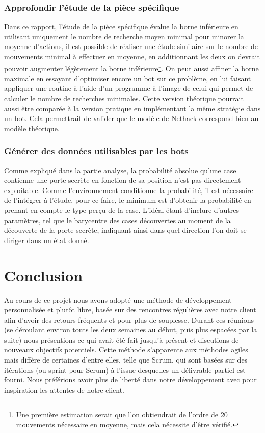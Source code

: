 \documentclass[a4paper,12pt]{article}
\begin{document}
\subsubsection{Approfondir l'étude de la pièce spécifique}
Dans ce rapport, l'étude de la pièce spécifique évalue la borne inférieure en
utilisant uniquement le nombre de recherche moyen minimal pour minorer la
moyenne d'actions, il est possible de réaliser une étude similaire sur le nombre
de mouvements minimal à effectuer en moyenne, en additionnant les deux on
devrait pouvoir augmenter légèrement la borne inférieure\footnote{Une première
estimation serait que l'on obtiendrait de l'ordre de 20 mouvements nécessaire en
moyenne, mais cela nécessite d'être vérifié.}. On peut aussi affiner la borne
maximale en essayant d'optimiser encore un bot sur ce problème, en lui faisant
appliquer une routine à l'aide d'un programme à l'image de celui qui permet de
calculer le nombre de recherches minimales. Cette version théorique pourrait
aussi être comparée à la version pratique en implémentant la même stratégie dans
un bot. Cela permettrait de valider que le modèle de Nethack correspond bien au
modèle théorique.

\subsubsection{Générer des données utilisables par les bots}
Comme expliqué dans la partie analyse, la probabilité absolue qu'une case
contienne une porte secrète en fonction de sa position n'est pas directement
exploitable. Comme l'environnement conditionne la probabilité, il est nécessaire
de l'intégrer à l'étude, pour ce faire, le minimum est d'obtenir la probabilité
en prenant en compte le type perçu de la case. L'idéal étant d'inclure d'autres
paramètres, tel que le barycentre des cases découvertes au moment de la
découverte de la porte secrète, indiquant ainsi dans quel direction l'on doit
se diriger dans un état donné.

\section{Conclusion}

Au cours de ce projet nous avons adopté une méthode de développement
personnalisée et plutôt libre, basée sur des rencontres régulières avec notre
client afin d'avoir des retours fréquents et pour plus de souplesse. Durant
ces réunions (se déroulant environ touts les deux semaines au début, puis plus
espacées par la suite) nous présentions ce qui avait été fait jusqu'à présent
et discutions de nouveaux objectifs potentiels. Cette méthode s'apparente aux
méthodes agiles mais diffère de certaines d'entre elles, telle que Scrum, qui
sont basées sur des itérations (ou sprint pour Scrum) à l'issue desquelles un
délivrable partiel est fourni. Nous préférions avoir plus de liberté dans
notre développement avec pour inspiration les attentes de notre client.
\end{document}
